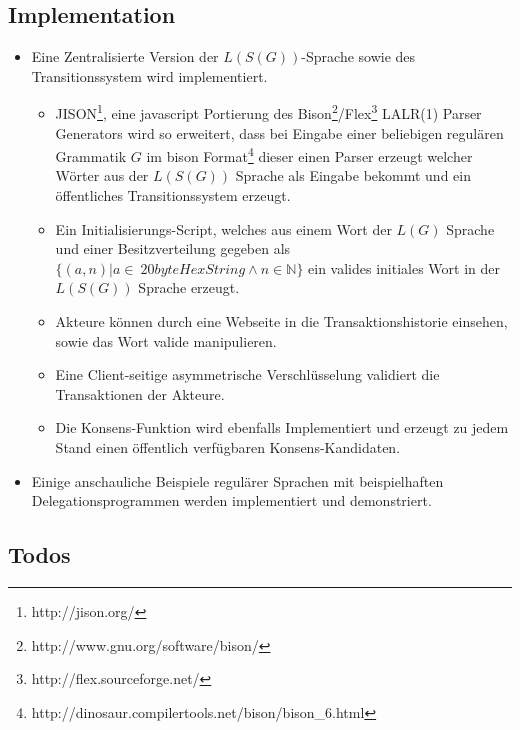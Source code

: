 \documentclass[]{article}
\begin{document}
\subsection*{Implementation}
\begin{itemize}
  \item Eine Zentralisierte Version der $L(S(G))$-Sprache sowie des Transitionssystem wird implementiert.
  \begin{itemize}
    \item JISON\footnote{http://jison.org/}, eine javascript Portierung des Bison\footnote{http://www.gnu.org/software/bison/}/Flex\footnote{http://flex.sourceforge.net/} LALR(1) Parser Generators wird so erweitert, dass bei Eingabe einer beliebigen regulären Grammatik $G$ im bison Format\footnote{http://dinosaur.compilertools.net/bison/bison\_6.html} dieser einen Parser erzeugt welcher Wörter aus der $L(S(G))$ Sprache als Eingabe bekommt und ein öffentliches Transitionssystem erzeugt.
    \item Ein Initialisierungs-Script, welches aus einem Wort der $L(G)$ Sprache und einer Besitzverteilung gegeben als $\{(a,n)| a\in\ 20byteHexString \land n\in \mathbb{N} \}$ ein valides initiales Wort in der $L(S(G))$ Sprache erzeugt.
    \item Akteure können durch eine Webseite in die Transaktionshistorie einsehen, sowie das Wort valide manipulieren.
    \item Eine Client-seitige asymmetrische Verschlüsselung validiert die Transaktionen der Akteure.
    \item Die Konsens-Funktion wird ebenfalls Implementiert und erzeugt zu jedem Stand einen öffentlich verfügbaren Konsens-Kandidaten.
  \end{itemize}
  \item Einige anschauliche Beispiele regulärer Sprachen mit beispielhaften Delegationsprogrammen werden implementiert und demonstriert.
\end{itemize}




\subsection*{Todos}

\listoftodos[Aufgaben]



\end{document}
